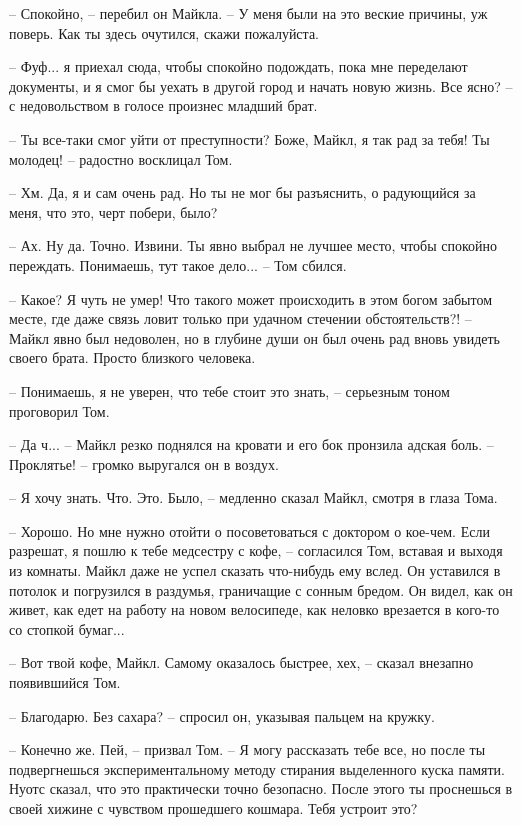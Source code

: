 – Спокойно, – перебил он Майкла. –  У меня были на это веские причины, уж поверь. Как ты здесь очутился, скажи пожалуйста. 

– Фуф... я приехал сюда, чтобы спокойно подождать, пока мне переделают документы, и я смог бы уехать в другой город и начать новую жизнь. Все ясно? – с недовольством в голосе произнес  младший брат.

– Ты все-таки смог уйти от преступности? Боже, Майкл, я так рад за тебя! Ты молодец! – радостно восклицал Том.

– Хм. Да, я и сам очень рад. Но ты не мог бы разъяснить, о радующийся за меня, что это, черт побери, было? 

– Ах. Ну да. Точно. Извини. Ты явно выбрал не лучшее место, чтобы спокойно переждать. Понимаешь, тут такое дело... – Том сбился.

– Какое? Я чуть не умер! Что такого может происходить в этом богом забытом месте, где даже связь ловит только при удачном стечении обстоятельств?! – Майкл явно был недоволен, но в глубине души он был очень рад вновь увидеть своего брата. Просто близкого человека. 

– Понимаешь, я не уверен, что тебе стоит это знать, – серьезным тоном проговорил Том. 

– Да ч... – Майкл резко поднялся на кровати и его бок пронзила адская боль. – Проклятье! – громко выругался он в воздух. 

– Я хочу знать. Что. Это. Было, – медленно сказал Майкл, смотря в глаза Тома.

– Хорошо. Но мне нужно отойти о посоветоваться с доктором о кое-чем. Если разрешат, я пошлю к тебе медсестру с кофе, – согласился Том, вставая и выходя из комнаты. Майкл даже не успел сказать что-нибудь ему вслед. Он уставился в потолок и погрузился в раздумья, граничащие с сонным бредом. Он видел, как он живет, как едет на работу на новом велосипеде, как неловко врезается в кого-то со стопкой бумаг... 

– Вот твой кофе, Майкл. Самому оказалось быстрее, хех, – сказал внезапно появившийся Том. 

– Благодарю. Без сахара? – спросил он, указывая пальцем на кружку.

– Конечно же. Пей, – призвал Том. – Я могу рассказать тебе все, но после ты подвергнешься экспериментальному методу стирания выделенного куска памяти. Нуотс сказал, что это практически точно безопасно. После этого ты проснешься в своей хижине с чувством прошедшего кошмара. Тебя устроит это? 

